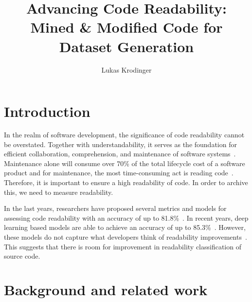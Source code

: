 \documentclass[%
class=scrreprt,
chapterprefix=false,%
open=right,%
twoside=false,%
paper=a4,%
logofile={Logo\_zentral\_farbig\_EN.png},%
thesistype=master,%
UKenglish,%
]{se2thesis}
\author{Lukas Krodinger}
\title{Advancing Code Readability: Mined \& Modified Code for Dataset Generation}
\institute{Chair of Software Engineering II}
\begin{document}
	
	\frontmatter
	
	\maketitle
	
	\mainmatter
	
	\tableofcontents
	
	\section{Introduction} \label{Introduction}
	
	
	In the realm of software development, the significance of code readability cannot be overstated. Together with understandability, it serves as the foundation for efficient collaboration, comprehension, and maintenance of software systems~\cite{posnett2011simpler, aggarwal2002integrated}. 
	Maintenance alone will consume over 70\% of the total lifecycle cost of a software product and for maintenance, the most time-consuming act is reading code~\cite{buse2009learning, deimel1985uses, rugaber2000use, boehm2001defect}.
	Therefore, it is important to ensure a high readability of code. In order to archive this, we need to measure readability.
	
	In the last years, researchers have proposed several metrics and models for assessing code readability with an accuracy of up to 81.8\%~\cite{buse2009learning, posnett2011simpler, dorn2012general, daka2015modeling}. In recent years, deep learning based models are able to achieve an accuracy of up to 85.3\%~\cite{mi2018improving, mi2022towards}.
	However, these models do not capture what developers think of readability improvements~\cite{fakhoury2019improving}. This suggests that there is room for improvement in readability classification of source code.
	
	\section{Background and related work} \label{Background and related work}
	
\end{document}
